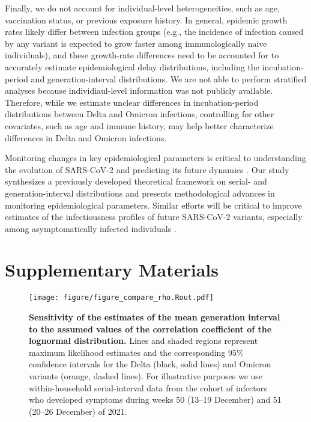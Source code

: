 \documentclass[12pt]{article}
\begin{document}
Finally, we do not account for individual-level heterogeneities, such as age, vaccination status, or previous exposure history.
In general, epidemic growth rates likely differ between infection groups (e.g., the incidence of infection caused by any variant is expected to grow faster among immunologically naive individuals), and these growth-rate differences need to be accounted for to accurately estimate epidemiological delay distributions, including the incubation-period and generation-interval distributions.
We are not able to perform stratified analyses because individiaul-level information was not publicly available.
Therefore, while we estimate unclear differences in incubation-period distributions between Delta and Omicron infections, controlling for other covariates, such as age and immune history, may help better characterize differences in Delta and Omicron infections.

Monitoring changes in key epidemiological parameters is critical to understanding the evolution of SARS-CoV-2 and predicting its future dynamics \citep{kraemer2021monitoring}.
Our study synthesizes a previously developed theoretical framework on serial- and generation-interval distributions and presents methodological advances in monitoring epidemiological parameters.
Similar efforts will be critical to improve estimates of the infectiousness profiles of future SARS-CoV-2 variants, especially among asymptomatically infected individuals \citep{park2020time}.

\pagebreak

\section*{Supplementary Materials}
\setcounter{figure}{0}
\renewcommand{\thefigure}{S\arabic{figure}}

\begin{figure}[!th]
\texttt{[image: figure/figure\_compare\_rho.Rout.pdf]}
\caption{
\textbf{Sensitivity of the estimates of the mean generation interval to the assumed values of the correlation coefficient of the lognormal distribution.}
Lines and shaded regions represent maximum likelihood estimates and the corresponding 95\% confidence intervals for the Delta (black, solid lines) and Omicron variants (orange, dashed lines).
For illustrative purposes we use within-household serial-interval data from the cohort of infectors who developed symptoms during weeks 50 (13--19 December) and 51 (20--26 December) of 2021.
}
\end{figure}
\end{document}
